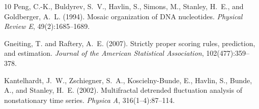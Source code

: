 \documentclass[12pt,a4paper]{article}
\begin{document}
\begin{thebibliography}{10}
Peng, C.-K., Buldyrev, S.~V., Havlin, S., Simons, M., Stanley, H.~E., and
  Goldberger, A.~L. (1994).
\newblock Mosaic organization of {DNA} nucleotides.
\newblock \emph{Physical Review E}, 49(2):1685--1689.

Gneiting, T. and Raftery, A.~E. (2007).
\newblock Strictly proper scoring rules, prediction, and estimation.
\newblock \emph{Journal of the American Statistical Association},
  102(477):359--378.

Kantelhardt, J.~W., Zschiegner, S.~A., Koscielny-Bunde, E., Havlin, S.,
  Bunde, A., and Stanley, H.~E. (2002).
\newblock Multifractal detrended fluctuation analysis of nonstationary time
  series.
\newblock \emph{Physica A}, 316(1--4):87--114.

\end{thebibliography}
\end{document}
